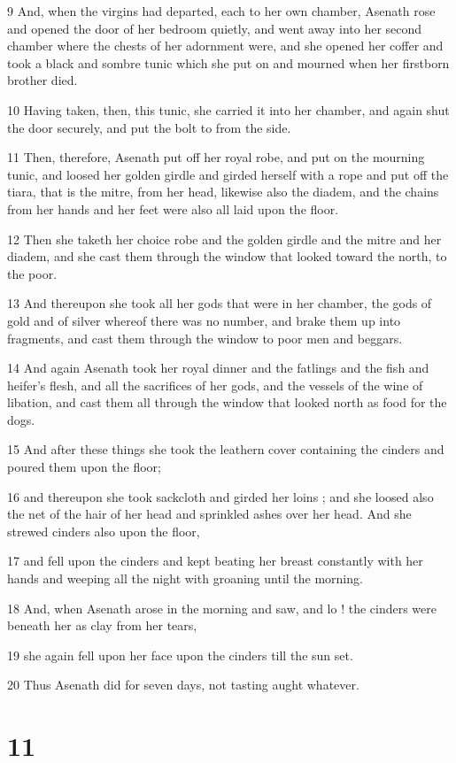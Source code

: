9 And, when the virgins had departed, each to her own chamber, Asenath rose and opened the door of her bedroom quietly, and went away into her second chamber where the chests of her adornment were, and she opened her coffer and took a black and sombre tunic which she put on and mourned when her firstborn brother died. 

10 Having taken, then, this tunic, she carried it into her chamber, and again shut the door securely, and put the bolt to from the side. 

11 Then, therefore, Asenath put off her royal robe, and put on the mourning tunic, and loosed her golden girdle and girded herself with a rope and put off the tiara, that is the mitre, from her head, likewise also the diadem, and the chains from her hands and her feet were also all laid upon the floor. 

12 Then she taketh her choice robe and the golden girdle and the mitre and her diadem, and she cast them through the window that looked toward the north, to the poor. 

13 And thereupon she took all her gods that were in her chamber, the gods of gold and of silver whereof there was no number, and brake them up into fragments, and cast them through the window to poor men and beggars. 

14 And again Asenath took her royal dinner and the fatlings and the fish and heifer's flesh, and all the sacrifices of her gods, and the vessels of the wine of libation, and cast them all through the window that looked north as food for the dogs. 

15 And after these things she took the leathern cover containing the cinders and poured them upon the floor; 

16 and thereupon she took sackcloth and girded her loins ; and she loosed also the net of the hair of her head and sprinkled ashes over her head. And she strewed cinders also upon the floor, 

17 and fell upon the cinders and kept beating her breast constantly with her hands and weeping all the night with groaning until the morning. 

18 And, when Asenath arose in the morning and saw, and lo ! the cinders were beneath her as clay from her tears, 

19 she again fell upon her face upon the cinders till the sun set. 

20 Thus Asenath did for seven days, not tasting aught whatever. 

\chapter{11}

